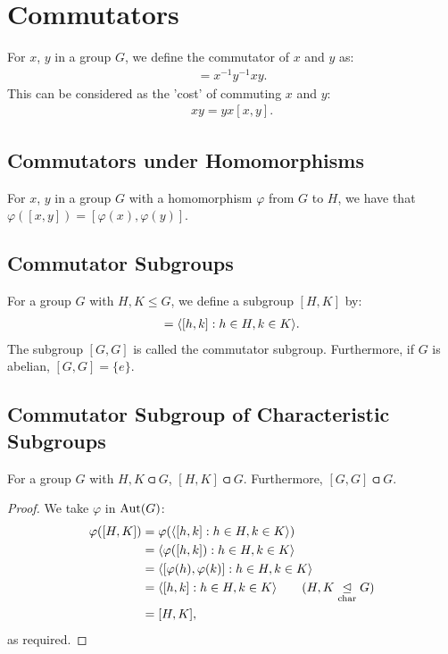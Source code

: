 \section{Commutators} 

For $x$, $y$ in a group $G$, we define the commutator
of $x$ and $y$ as: \begin{align*}
    [x, y] = x^{-1}y^{-1}xy.
\end{align*} This can be considered as the 'cost' of commuting
$x$ and $y$: \begin{align*}
    xy = yx[x, y].
\end{align*} 

\subsection{Commutators under Homomorphisms} \label{2.3}

For $x$, $y$ in a group $G$ with a homomorphism $\varphi$ from $G$ to $H$, 
we have that $\varphi([x, y]) = [\varphi(x), \varphi(y)]$.

\subsection{Commutator Subgroups}

For a group $G$ with $H, K \leq G$, we define a subgroup $[H, K]$ by:
\begin{align*}
    [H, K] = \ang{[h, k] : h \in H, k \in K}.
\end{align*} The subgroup $[G, G]$ is called the commutator subgroup.
Furthermore, if $G$ is abelian, $[G, G] = \{e\}$.

\subsection{Commutator Subgroup of Characteristic Subgroups} \label{2.27}

For a group $G$ with $H, K \csub G$, $[H, K] \csub G$. Furthermore,
$[G, G] \csub G$.

\begin{proof}
    We take $\varphi$ in $\operatorname{Aut}(G)$: \begin{align*}
        \varphi([H, K]) 
        &= \varphi(\ang{[h, k] : h \in H, k \in K}) \\
        &= \ang{\varphi([h, k]) : h \in H, k \in K} \\
        &= \ang{[\varphi(h), \varphi(k)] : h \in H, k \in K} \\
        &= \ang{[h, k] : h \in H, k \in K} \tag{$H, K \csub G$} \\
        &= [H, K],
    \end{align*} as required.
\end{proof}

